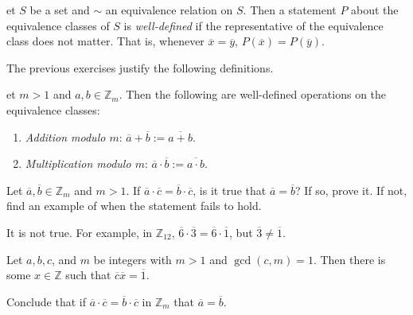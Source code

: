 \documentclass[english,course]{lecture}
\newenvironment{facnote}{\startfacnote}{}
\def\startfacnote#1\end{\margintext{{\sc Note:} #1}\end}
\theoremstyle{plain}
\newenvironment{question}[1]
  {\renewcommand\theinnerquestion{#1}\innerquestion}
  {\endinnerquestion}
\newenvironment{definition}[1]
  {\renewcommand\theinnerdefinition{#1}\innerdefinition}
  {\endinnerdefinition}
\def\Z{{\mathbb Z}}
\def\presnotes{}
\begin{document}
\presnotes

\begin{definition}
	Let $S$ be a set and $\sim$ an equivalence relation on $S$.
	Then a statement $P$ about the equivalence classes of $S$ is \emph{well-defined} if the representative of the equivalence class does not matter.
	That is, whenever $\overline{x} = \overline{y}$, $P(\overline{x}) = P(\overline{y})$.
\end{definition}

The previous exercises justify the following definitions.

\begin{definition}
	Let $m > 1$ and $a,b\in \Z_m$.
	Then the following are well-defined operations on the equivalence classes:
	\begin{enumerate}
		\item \emph{Addition modulo $m$}: $\overline{a} + \overline{b} := \overline{a+b}$.
		\item \emph{Multiplication modulo $m$}: $\overline{a}\cdot \overline{b} := \overline{a\cdot b}$.
	\end{enumerate}
\end{definition}


\begin{question}\label{q:zmodmcancel}
	Let $\overline{a},\overline{b}\in \Z_m$ and $m > 1$.
	If $\overline{a}\cdot \overline{c} = \overline{b}\cdot \overline{c}$, is it true that $\overline{a} = \overline{b}$?
	If so, prove it.
	If not, find an example of when the statement fails to hold.
\end{question}

\begin{answer}
	It is not true.
	For example, in $\Z_{12}$, $\overline{6}\cdot \overline{3} = \overline{6}\cdot\overline{1}$, but $\overline{3}\ne \overline{1}$.
\end{answer}

\presnotes


\begin{theorem}
	Let $a,b,c$, and $m$ be integers with $m > 1$ and $\gcd(c,m)=1$.
	Then there is some $x\in \Z$ such that $\overline{c} \overline{x} = \overline{1}$.

	Conclude that if $\overline{a} \cdot\overline{c} = \overline{b}\cdot\overline{c}$ in $\Z_m$ that $\overline{a} = \overline{b}$. 	
\end{theorem}
\end{document}
